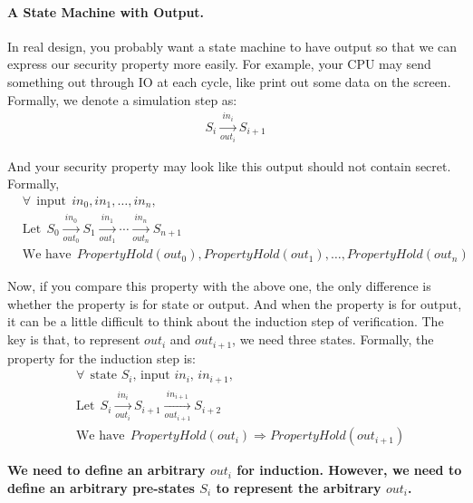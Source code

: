 \documentclass{article}
\begin{document}
\paragraph{A State Machine with Output.}

In real design, you probably want a state machine to have output so that we can express our security property more easily.
For example, your CPU may send something out through IO at each cycle, like print out some data on the screen.
Formally, we denote a simulation step as:
\begin{align*}
S_i \xrightarrow[out_i]{in_i} S_{i+1}
\end{align*}

And your security property may look like this output should not contain secret.
Formally,
\begin{align*}
& \forall ~~ \text{input} ~~ in_0, in_1, \dots, in_n, \\
& \text{Let} ~~ S_0 \xrightarrow[out_0]{in_0} S_{1} \xrightarrow[out_1]{in_1} \cdots \xrightarrow[out_n]{in_n} S_{n+1} \\
& \text{We have} ~~ PropertyHold(out_0), PropertyHold(out_1), \dots, PropertyHold(out_n)
\end{align*}

Now, if you compare this property with the above one, the only difference is whether the property is for state or output.
And when the property is for output, it can be a little difficult to think about the induction step of verification.
The key is that, to represent $out_i$ and $out_{i+1}$, we need three states.
Formally, the property for the induction step is:
\begin{align*}
& \forall ~~ \text{state $S_i$, input $in_i$, $in_{i+1}$}, \\
& \text{Let} ~~ S_i \xrightarrow[out_{i}]{in_i} S_{i+1} \xrightarrow[out_{i+1}]{in_{i+1}} S_{i+2} \\
& \text{We have} ~~ PropertyHold(out_{i}) \Rightarrow PropertyHold(out_{i+1})
\end{align*}

\textbf{We need to define an arbitrary $out_i$ for induction. However, we need to define an arbitrary pre-states $S_i$ to represent the arbitrary $out_i$.}





\end{document}

